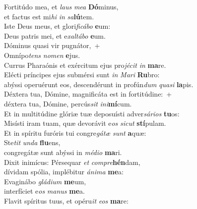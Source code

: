 \evenverse Fortitúdo mea, et \textit{laus} \textit{me}\textit{a} \textbf{Dó}minus,~\*\\
\evenverse et factus est mi\textit{hi} \textit{in} \textit{sa}\textbf{lú}tem.\\
\oddverse Iste Deus meus, et glori\textit{fi}\textit{cá}\textit{bo} \textbf{e}um:~\*\\
\oddverse Deus patris mei, et e\textit{xal}\textit{tá}\textit{bo} \textbf{e}um.\\
\evenverse Dóminus quasi vir pugnátor,~+\\
\evenverse  Omnípo\textit{tens} \textit{no}\textit{men} \textbf{e}jus.~\*\\
\evenverse Currus Pharaónis et exércitum ejus pro\textit{jé}\textit{cit} \textit{in} \textbf{ma}re.\\
\oddverse Elécti príncipes ejus submérsi sunt \textit{in} \textit{Ma}\textit{ri} \textbf{Ru}bro:~\*\\
\oddverse abýssi operuérunt eos, descendérunt in profún\textit{dum} \textit{qua}\textit{si} \textbf{la}pis.\\
\evenverse Déxtera tua, Dómine, magnificáta est in fortitúdine:~+\\
\evenverse  déxtera tua, Dómine, percús\textit{sit} \textit{i}\textit{ni}\textbf{mí}cum.~\*\\
\evenverse Et in multitúdine glóriæ tuæ deposuísti adver\textit{sá}\textit{ri}\textit{os} \textbf{tu}os:\\
\oddverse Misísti iram tuam, quæ devorávit e\textit{os} \textit{si}\textit{cut} \textbf{stí}pulam.~\*\\
\oddverse Et in spíritu furóris tui congre\textit{gá}\textit{tæ} \textit{sunt} \textbf{a}quæ:\\
\evenverse Ste\textit{tit} \textit{un}\textit{da} \textbf{flu}ens,~\*\\
\evenverse congregátæ sunt abýssi in \textit{mé}\textit{di}\textit{o} \textbf{ma}ri.\\
\oddverse Dixit inimícus: Pérsequar \textit{et} \textit{com}\textit{pre}\textbf{hén}dam,~\*\\
\oddverse dívidam spólia, implébitur \textit{á}\textit{ni}\textit{ma} \textbf{me}a:\\
\evenverse Evaginábo \textit{glá}\textit{di}\textit{um} \textbf{me}um,~\*\\
\evenverse interfíciet e\textit{os} \textit{ma}\textit{nus} \textbf{me}a.\\
\oddverse Flavit spíritus tuus, et opéru\textit{it} \textit{e}\textit{os} \textbf{ma}re:~\*\\
